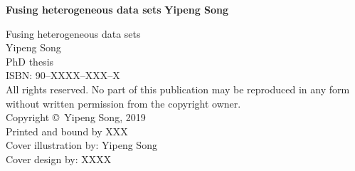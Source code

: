 {\pagestyle{empty}
\newcommand{\printtitle}{%
{\Huge\bf Fusing heterogeneous data sets}}  %

\begin{titlepage}
\par\vskip 2cm
\begin{center}
\printtitle
\vskip 2cm
{\LARGE\bf Yipeng Song}                           %
\vfill
\end{center}
\end{titlepage}

\clearpage
\noindent%
{
\vfill
\noindent%
Fusing heterogeneous data sets \\
Yipeng Song \\
PhD thesis \\
ISBN: 90--XXXX--XXX--X \\[2ex]     %

\noindent%
All rights reserved. No part of this publication may be reproduced in any form
without written permission from the copyright owner.\\[2ex]

\noindent%
Copyright \copyright\ Yipeng Song, 2019 \\[2ex] %

\noindent%
Printed and bound by XXX\\    %
Cover illustration by: Yipeng Song \\  %
Cover design by: XXXX\\             %
\vskip 2cm
}

}
